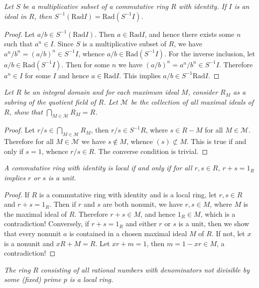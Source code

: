 \begin{problem}\em
Let $S$ be a multiplicative subset of a commutative ring $R$ with identity. If $I$ is an ideal in $R$, then $S^{-1}(\mathrm{Rad}I)=\mathrm{Rad}(S^{-1}I)$.
\end{problem}
\begin{proof}
Let $a/b\in S^{-1}(\mathrm{Rad}I)$. Then $a\in\mathrm{Rad}I$, and hence there exists some $n$ such that $a^n\in I$. Since $S$ is a multiplicative subset of $R$, we have $a^n/b^n=(a/b)^n\in S^{-1}I$, whence $a/b\in\mathrm{Rad}(S^{-1}I)$. For the inverse inclusion, let $a/b\in\mathrm{Rad}(S^{-1}I)$. Then for some $n$ we have $(a/b)^n=a^n/b^n\in S^{-1}I$. Therefore $a^n\in I$ for some $I$ and hence $a\in\mathrm{Rad}I$. This implies $a/b\in S^{-1}\mathrm{Rad}I$.
\end{proof}
\begin{problem}\em
Let $R$ be an integral domain and for each maximum ideal $M$, consider $R_M$ as a subring of the quotient field of $R$. Let $\mathcal{M}$ be the collection of all maximal ideals of $R$, show that $\bigcap_{M\in\mathcal{M}}R_M=R$.
\end{problem}
\begin{proof}
Let $r/s\in\bigcap_{M\in\mathcal{M}}R_M$, then $r/s\in S^{-1}R$, where $s\in R-M$ for all $M\in\mathcal{M}$. Therefore for all $M\in\mathcal{M}$ we have $s\notin M$, whence $(s)\not\subset M$. This is true if and only if $s=1$, whence $r/s\in R$. The converse condition is trivial.
\end{proof}
\begin{problem}\em
A commutative ring with identity is local if and only if for all $r,s\in R$, $r+s=1_R$ implies $r$ or $s$ is a unit.
\end{problem}
\begin{proof}
If $R$ is a commutative ring with identity and is a local ring, let $r,s\in R$ and $r+s=1_R$. Then if $r$ and $s$ are both nonunit, we have $r,s\in M$, where $M$ is the maximal ideal of $R$. Therefore $r+s\in M$, and hence $1_R\in M$, which is a contradiction! Conversely, if $r+s=1_R$ and either $r$ or $s$ is a unit, then we show that every nonunit $a$ is contained in a chosen maximal ideal $M$ of $R$. If not, let $x$ is a nonunit and $xR+M=R$. Let $xr+m=1$, then $m=1-xr\in M$, a contradiction!
\end{proof}
\begin{problem}\em
The ring $R$ consisting of all rational numbers with denominators not divisible by some (fixed) prime $p$ is a local ring.
\end{problem}
